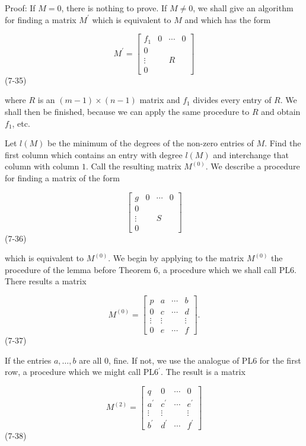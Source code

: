 Proof: If \(M=0\), there is nothing to prove. If \(M\neq 0\), we shall give an algorithm for finding a matrix \(M^{\prime}\) which is equivalent to \(M\) and which has the form

\[M^{\prime}=\begin{bmatrix}f_{1}&0&\cdots&0\\ 0&&&\\ \vdots&&R&\\ 0&&&\end{bmatrix}\] (7-35)

where \(R\) is an \((m-1)\times(n-1)\) matrix and \(f_{1}\) divides every entry of \(R\). We shall then be finished, because we can apply the same procedure to \(R\) and obtain \(f_{1}\), etc.

Let \(l(M)\) be the minimum of the degrees of the non-zero entries of \(M\). Find the first column which contains an entry with degree \(l(M)\) and interchange that column with column \(1\). Call the resulting matrix \(M^{(0)}\). We describe a procedure for finding a matrix of the form

\[\begin{bmatrix}g&0&\cdots&0\\ 0&&&\\ \vdots&&S&\\ 0&&&\end{bmatrix}\] (7-36)

which is equivalent to \(M^{(0)}\). We begin by applying to the matrix \(M^{(0)}\) the procedure of the lemma before Theorem 6, a procedure which we shall call PL6. There results a matrix

\[M^{(0)}=\begin{bmatrix}p&a&\cdots&b\\ 0&c&\cdots&d\\ \vdots&\vdots&&\vdots\\ 0&e&\cdots&f\end{bmatrix}.\] (7-37)

If the entries \(a,\ldots,b\) are all \(0\), fine. If not, we use the analogue of PL6 for the first row, a procedure which we might call PL6\({}^{\prime}\). The result is a matrix

\[M^{(2)}=\begin{bmatrix}q&0&\cdots&0\\ a^{\prime}&c^{\prime}&\cdots&e^{\prime}\\ \vdots&\vdots&&\vdots\\ b^{\prime}&d^{\prime}&\cdots&f^{\prime}\end{bmatrix}\] (7-38)

